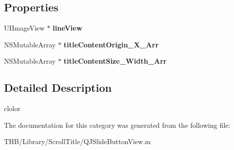 \subsection*{Properties}
\begin{DoxyCompactItemize}
\item 
\mbox{\label{category_q_j_slide_button_view_07_08_a27772cdb736851c398ce634f0805b789}} 
U\+I\+Image\+View $\ast$ {\bfseries line\+View}
\item 
\mbox{\label{category_q_j_slide_button_view_07_08_ad330d1935de225cdeed3bcee987f17c6}} 
N\+S\+Mutable\+Array $\ast$ {\bfseries title\+Content\+Origin\+\_\+\+X\+\_\+\+Arr}
\item 
\mbox{\label{category_q_j_slide_button_view_07_08_a271ecb1ad16447e4e67185ec93400314}} 
N\+S\+Mutable\+Array $\ast$ {\bfseries title\+Content\+Size\+\_\+\+Width\+\_\+\+Arr}
\end{DoxyCompactItemize}


\subsection{Detailed Description}
clolor 

The documentation for this category was generated from the following file\+:\begin{DoxyCompactItemize}
\item 
T\+H\+B/\+Library/\+Scroll\+Title/Q\+J\+Slide\+Button\+View.\+m\end{DoxyCompactItemize}
